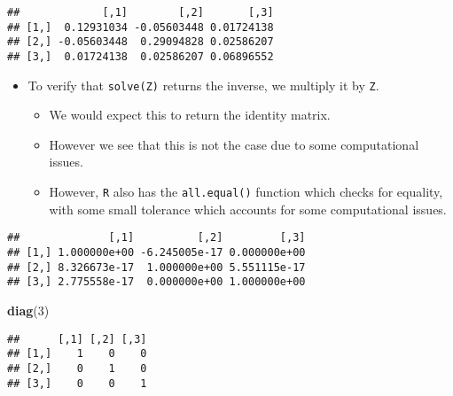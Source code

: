 \documentclass[]{book}
\newenvironment{Shaded}{\begin{snugshade}}{\end{snugshade}}
\newcommand{\DecValTok}[1]{\textcolor[rgb]{0.00,0.00,0.81}{#1}}
\newcommand{\KeywordTok}[1]{\textcolor[rgb]{0.13,0.29,0.53}{\textbf{#1}}}
\newcommand{\NormalTok}[1]{#1}
\newcommand{\OperatorTok}[1]{\textcolor[rgb]{0.81,0.36,0.00}{\textbf{#1}}}
\newcommand{\StringTok}[1]{\textcolor[rgb]{0.31,0.60,0.02}{#1}}
\providecommand{\tightlist}{%
  \setlength{\itemsep}{0pt}\setlength{\parskip}{0pt}}
\begin{document}
\begin{verbatim}
##             [,1]        [,2]       [,3]
## [1,]  0.12931034 -0.05603448 0.01724138
## [2,] -0.05603448  0.29094828 0.02586207
## [3,]  0.01724138  0.02586207 0.06896552
\end{verbatim}

\begin{itemize}
\tightlist
\item
  To verify that \texttt{solve(Z)} returns the inverse, we multiply it by \texttt{Z}.

  \begin{itemize}
  \tightlist
  \item
    We would expect this to return the identity matrix.
  \item
    However we see that this is not the case due to some computational issues.
  \item
    However, \texttt{R} also has the \texttt{all.equal()} function which checks for equality, with some small tolerance which accounts for some computational issues.
  \end{itemize}
\end{itemize}

\begin{Shaded}
\end{Shaded}

\begin{verbatim}
##              [,1]          [,2]         [,3]
## [1,] 1.000000e+00 -6.245005e-17 0.000000e+00
## [2,] 8.326673e-17  1.000000e+00 5.551115e-17
## [3,] 2.775558e-17  0.000000e+00 1.000000e+00
\end{verbatim}

\begin{Shaded}
\begin{Highlighting}[]
\KeywordTok{diag}\NormalTok{(}\DecValTok{3}\NormalTok{)}
\end{Highlighting}
\end{Shaded}

\begin{verbatim}
##      [,1] [,2] [,3]
## [1,]    1    0    0
## [2,]    0    1    0
## [3,]    0    0    1
\end{verbatim}

\begin{Shaded}
\end{Shaded}
\end{document}
